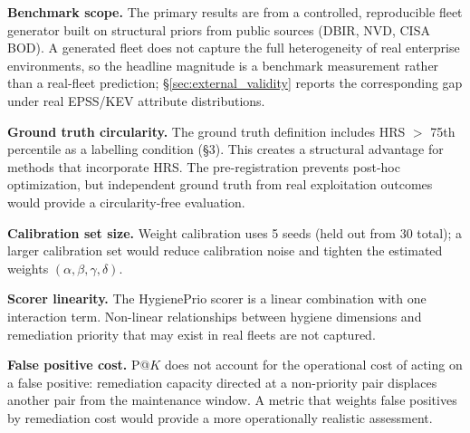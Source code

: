 \textbf{Benchmark scope.} The primary results are from a controlled, reproducible fleet generator built on structural priors from public sources (DBIR, NVD, CISA BOD). A generated fleet does not capture the full heterogeneity of real enterprise environments, so the headline magnitude is a benchmark measurement rather than a real-fleet prediction; \S\ref{sec:external_validity} reports the corresponding gap under real EPSS/KEV attribute distributions.

\textbf{Ground truth circularity.} The ground truth definition includes HRS $>$ 75th percentile as a labelling condition (\S3). This creates a structural advantage for methods that incorporate HRS. The pre-registration prevents post-hoc optimization, but independent ground truth from real exploitation outcomes would provide a circularity-free evaluation.

\textbf{Calibration set size.} Weight calibration uses 5 seeds (held out from 30 total); a larger calibration set would reduce calibration noise and tighten the estimated weights $(\alpha, \beta, \gamma, \delta)$.

\textbf{Scorer linearity.} The HygienePrio scorer is a linear combination with one interaction term. Non-linear relationships between hygiene dimensions and remediation priority that may exist in real fleets are not captured.

\textbf{False positive cost.} P@$K$ does not account for the operational cost of acting on a false positive: remediation capacity directed at a non-priority pair displaces another pair from the maintenance window. A metric that weights false positives by remediation cost would provide a more operationally realistic assessment.
